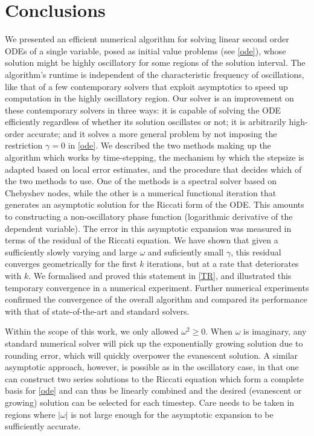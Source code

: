 \documentclass[10pt]{article}
\newcommand{\om}{\omega}
\newcommand{\g}{\gamma}
\begin{document}
\section{Conclusions \label{conclusions}}

We presented an efficient numerical algorithm for solving linear second order
ODEs of a single variable, posed as initial value problems (see \cref{ode}), whose solution
might be highly oscillatory for some regions of the solution interval.
The
algorithm's runtime is independent of the characteristic frequency of
oscillations, like that of a few contemporary solvers that exploit asymptotics to speed up computation in the highly oscillatory region.
Our solver is an improvement on these contemporary solvers
in three ways: it is capable of solving the ODE efficiently regardless of
whether its solution oscillates or not; it is arbitrarily high-order accurate;
and it solves a more general problem by not imposing the restriction $\gamma =
0$ in \cref{ode}. 
We described the two methods making up the algorithm which works by
time-stepping, the mechanism by which the stepsize is adapted based on local
error estimates, and the procedure that decides which of the two methods to
use. One of the methods is a spectral solver based on Chebyshev nodes, while
the other is a numerical functional iteration that generates an asymptotic
solution for the Riccati form of the ODE. This amounts to constructing a
non-oscillatory phase function (logarithmic derivative of the dependent
variable). The error in this asymptotic expansion was measured in terms of the
residual of the Riccati equation. We have shown that given a sufficiently
slowly varying and large $\om$ and suficiently small $\g$, this residual
converges geometrically for the first $k$ iterations, but at a rate that
deteriorates with $k$. We formalised and proved this statement in \cref{TR},
and illustrated this temporary convergence in a numerical experiment. Further
numerical experiments confirmed the convergence of the overall algorithm and
compared its performance with that of state-of-the-art and standard solvers.

Within the scope of this work, we only allowed $\om^2 \geq 0$. When $\om$ is
imaginary, any standard numerical solver will pick up the exponentially growing
solution due to rounding error, which will quickly overpower the evanescent
solution. A similar asymptotic approach, however, is possible as in the
oscillatory case, in that one can construct two series solutions to the Riccati
equation which form a complete basis for \cref{ode} and can thus be linearly
combined and the desired (evanescent or growing) solution can be selected for
each timestep. Care needs to be taken in regions where $|\om|$ is not large
enough for the asymptotic expansion to be sufficiently accurate.
\end{document}
